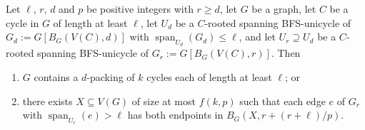 \documentclass{patmorin}
\DeclareMathOperator{\spn}{span}
\begin{document}
\begin{lem}
  Let $\ell$, $r$, $d$ and $p$ be positive integers with $r\ge d$, let $G$ be a graph, let $C$ be a cycle in $G$ of length at least $\ell$, let $U_d$ be a $C$-rooted spanning BFS-unicycle of $G_d:=G[B_G(V(C),d)]$ with $\spn_{U_d}(G_d)\le\ell$, and let $U_r\supseteq U_d$ be a $C$-rooted spanning BFS-unicycle of $G_r:=G[B_G(V(C),r)]$. Then
  \begin{enumerate}[nosep,nolistsep,label=\rm(\alph*),ref=(\alph*)]
    \item\label{packing_blowup} $G$ contains a $d$-packing of $k$ cycles each of length at least $\ell$; or

    \item\label{hitting} there exists $X\subseteq V(G)$ of size at most $f(k,p)$ such that each edge $e$ of $G_r$ with $\spn_{U_r}(e)>\ell$ has both endpoints in $B_G(X,r+(r+\ell)/p)$.
  \end{enumerate}
\end{lem}
\end{document}
